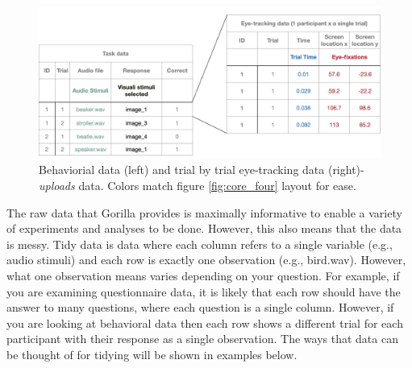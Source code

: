 \begin{figure}[ht]
    \centering
    \includegraphics[scale=.3]{figures/data_structure.png}
    \caption{Behaviorial data (left) and trial by trial eye-tracking data (right)-\textit{uploads} data. Colors match figure \ref{fig:core_four} layout for ease.}
    \label{fig:data_structure}
\end{figure}

The raw data that Gorilla provides is maximally informative to enable a variety of experiments and analyses to be done. However, this also means that the data is messy. Tidy data is data where each column refers to a single variable (e.g., audio stimuli) and each row is exactly one observation (e.g., bird.wav). However, what one observation means varies depending on your question. For example, if you are examining questionnaire data, it is likely that each row should have the answer to many questions, where each question is a single column. However, if you are looking at behavioral data then each row shows a different trial for each participant with their response as a single observation. The ways that data can be thought of for tidying will be shown in examples below.


